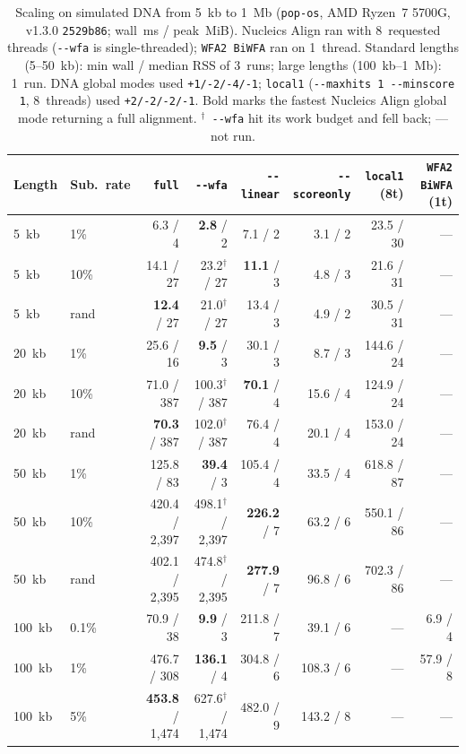 \documentclass[11pt,a4paper]{article}
\begin{document}
\begin{table}[t]
\centering
\caption{Scaling on simulated DNA from 5~kb to 1~Mb (\texttt{pop-os}, AMD Ryzen~7 5700G, v1.3.0 \texttt{2529b86}; wall~ms / peak~MiB). Nucleics Align ran with 8~requested threads (\texttt{-{}-wfa} is single-threaded); \texttt{WFA2 BiWFA} ran on 1~thread. Standard lengths (5--50~kb): min wall / median RSS of 3~runs; large lengths (100~kb--1~Mb): 1~run. DNA global modes used \texttt{+1/-2/-4/-1}; \texttt{local1} (\texttt{-{}-maxhits 1 -{}-minscore 1}, 8~threads) used \texttt{+2/-2/-2/-1}. Bold marks the fastest Nucleics Align global mode returning a full alignment. $^{\dagger}$~\texttt{-{}-wfa} hit its work budget and fell back; --- not run.}
\label{tab:scaling}
\scriptsize
\setlength{\tabcolsep}{3.0pt}
\begin{tabular}{@{}llrrrrrr@{}}
\toprule
Length & Sub.\ rate & \texttt{full} & \texttt{-{}-wfa} & \texttt{-{}-linear} & \texttt{-{}-scoreonly} & \texttt{local1} (8t) & \texttt{WFA2 BiWFA} (1t) \\
\midrule
5~kb & 1\% & 6.3 / 4 & \textbf{2.8} / 2 & 7.1 / 2 & 3.1 / 2 & 23.5 / 30 & --- \\
5~kb & 10\% & 14.1 / 27 & 23.2$^{\dagger}$ / 27 & \textbf{11.1} / 3 & 4.8 / 3 & 21.6 / 31 & --- \\
5~kb & rand & \textbf{12.4} / 27 & 21.0$^{\dagger}$ / 27 & 13.4 / 3 & 4.9 / 2 & 30.5 / 31 & --- \\
20~kb & 1\% & 25.6 / 16 & \textbf{9.5} / 3 & 30.1 / 3 & 8.7 / 3 & 144.6 / 24 & --- \\
20~kb & 10\% & 71.0 / 387 & 100.3$^{\dagger}$ / 387 & \textbf{70.1} / 4 & 15.6 / 4 & 124.9 / 24 & --- \\
20~kb & rand & \textbf{70.3} / 387 & 102.0$^{\dagger}$ / 387 & 76.4 / 4 & 20.1 / 4 & 153.0 / 24 & --- \\
50~kb & 1\% & 125.8 / 83 & \textbf{39.4} / 3 & 105.4 / 4 & 33.5 / 4 & 618.8 / 87 & --- \\
50~kb & 10\% & 420.4 / 2,397 & 498.1$^{\dagger}$ / 2,397 & \textbf{226.2} / 7 & 63.2 / 6 & 550.1 / 86 & --- \\
50~kb & rand & 402.1 / 2,395 & 474.8$^{\dagger}$ / 2,395 & \textbf{277.9} / 7 & 96.8 / 6 & 702.3 / 86 & --- \\
100~kb & 0.1\% & 70.9 / 38 & \textbf{9.9} / 3 & 211.8 / 7 & 39.1 / 6 & --- & 6.9 / 4 \\
100~kb & 1\% & 476.7 / 308 & \textbf{136.1} / 4 & 304.8 / 6 & 108.3 / 6 & --- & 57.9 / 8 \\
100~kb & 5\% & \textbf{453.8} / 1,474 & 627.6$^{\dagger}$ / 1,474 & 482.0 / 9 & 143.2 / 8 & --- & --- \\

\end{tabular}
\end{table}
\end{document}
